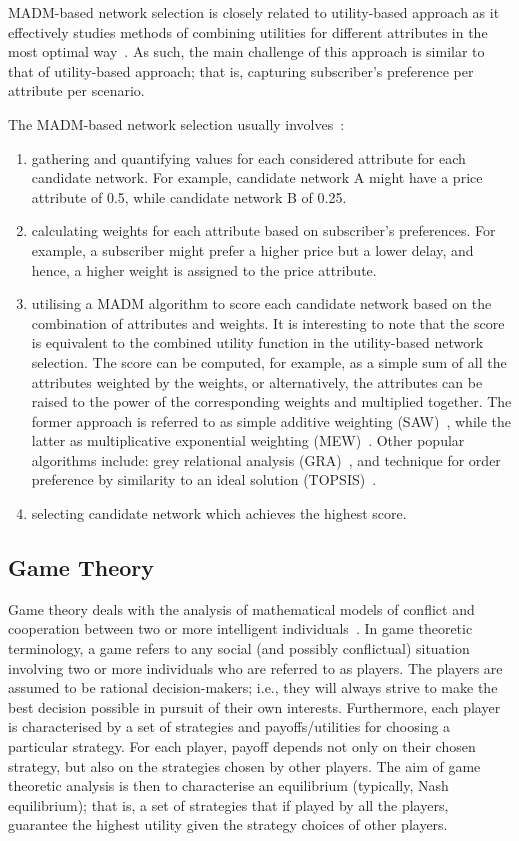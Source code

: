 MADM-based network selection is closely related to utility-based approach as it effectively studies methods of combining utilities for different attributes in the most optimal way~\cite{LushengKuo2013}. As such, the main challenge of this approach is similar to that of utility-based approach; that is, capturing subscriber's preference per attribute per scenario.

The MADM-based network selection usually involves~\cite{LushengKuo2013}:
\begin{enumerate}
\item gathering and quantifying values for each considered attribute for each candidate network. For example, candidate network A might have a price attribute of 0.5, while candidate network B of 0.25.
\item calculating weights for each attribute based on subscriber's preferences. For example, a subscriber might prefer a higher price but a lower delay, and hence, a higher weight is assigned to the price attribute.
\item utilising a MADM algorithm to score each candidate network based on the combination of attributes and weights. It is interesting to note that the score is equivalent to the combined utility function in the utility-based network selection. The score can be computed, for example, as a simple sum of all the attributes weighted by the weights, or alternatively, the attributes can be raised to the power of the corresponding weights and multiplied together. The former approach is referred to as simple additive weighting (SAW)~\cite{BariLeung2007a}, while the latter as multiplicative exponential weighting (MEW)~\cite{Nguyen2008}. Other popular algorithms include: grey relational analysis (GRA)~\cite{Song2005}, and technique for order preference by similarity to an ideal solution (TOPSIS)~\cite{BariLeung2007b}.
\item selecting candidate network which achieves the highest score.
\end{enumerate}

\subsection{Game Theory} %
\label{sub:game_theory_intelligent}
Game theory deals with the analysis of mathematical models of conflict and cooperation between two or more intelligent individuals~\cite{Myerson97,Gibbons92,Webb07}. In game theoretic terminology, a game refers to any social (and possibly conflictual) situation involving two or more individuals who are referred to as players. The players are assumed to be rational decision-makers; i.e., they will always strive to make the best decision possible in pursuit of their own interests. Furthermore, each player is characterised by a set of strategies and payoffs/utilities for choosing a particular strategy. For each player, payoff depends not only on their chosen strategy, but also on the strategies chosen by other players. The aim of game theoretic analysis is then to characterise an equilibrium (typically, Nash equilibrium); that is, a set of strategies that if played by all the players, guarantee the highest utility given the strategy choices of other players.

